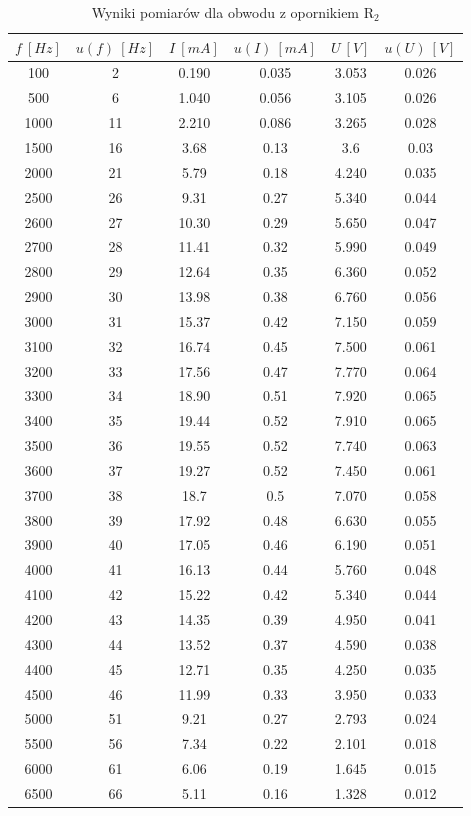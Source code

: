 \documentclass[12pt, a4paper, oneside]{article}
\begin{document}
\clearpage
\begin{table}[h]
  \centering
  \caption{Wyniki pomiarów dla obwodu z opornikiem R$_2$}
    \begin{tabular}{|c|c|c|c|c|c|}\hline
    $f~[Hz]$ & $u(f)~[Hz]$ & $I~[mA]$ & $u(I)~[mA]$ & $U~[V]$ & $u(U)~[V]$ \\\hline
    100 & 2 & 0.190 & 0.035 & 3.053 & 0.026 \\\hline
    500 & 6 & 1.040 & 0.056 & 3.105 & 0.026 \\\hline
    1000 & 11 & 2.210 & 0.086 & 3.265 & 0.028 \\\hline
    1500 & 16 & 3.68 & 0.13 & 3.6 & 0.03 \\\hline
    2000 & 21 & 5.79 & 0.18 & 4.240 & 0.035 \\\hline
    2500 & 26 & 9.31 & 0.27 & 5.340 & 0.044 \\\hline
    2600 & 27 & 10.30 & 0.29 & 5.650 & 0.047 \\\hline
    2700 & 28 & 11.41 & 0.32 & 5.990 & 0.049 \\\hline
    2800 & 29 & 12.64 & 0.35 & 6.360 & 0.052 \\\hline
    2900 & 30 & 13.98 & 0.38 & 6.760 & 0.056 \\\hline
    3000 & 31 & 15.37 & 0.42 & 7.150 & 0.059 \\\hline
    3100 & 32 & 16.74 & 0.45 & 7.500 & 0.061 \\\hline
    3200 & 33 & 17.56 & 0.47 & 7.770 & 0.064 \\\hline
    3300 & 34 & 18.90 & 0.51 & 7.920 & 0.065 \\\hline
    3400 & 35 & 19.44 & 0.52 & 7.910 & 0.065 \\\hline
    3500 & 36 & 19.55 & 0.52 & 7.740 & 0.063 \\\hline
    3600 & 37 & 19.27 & 0.52 & 7.450 & 0.061 \\\hline
    3700 & 38 & 18.7 & 0.5 & 7.070 & 0.058 \\\hline
    3800 & 39 & 17.92 & 0.48 & 6.630 & 0.055 \\\hline
    3900 & 40 & 17.05 & 0.46 & 6.190 & 0.051 \\\hline
    4000 & 41 & 16.13 & 0.44 & 5.760 & 0.048 \\\hline
    4100 & 42 & 15.22 & 0.42 & 5.340 & 0.044 \\\hline
    4200 & 43 & 14.35 & 0.39 & 4.950 & 0.041 \\\hline
    4300 & 44 & 13.52 & 0.37 & 4.590 & 0.038 \\\hline
    4400 & 45 & 12.71 & 0.35 & 4.250 & 0.035 \\\hline
    4500 & 46 & 11.99 & 0.33 & 3.950 & 0.033 \\\hline
    5000 & 51 & 9.21 & 0.27 & 2.793 & 0.024 \\\hline
    5500 & 56 & 7.34 & 0.22 & 2.101 & 0.018 \\\hline
    6000 & 61 & 6.06 & 0.19 & 1.645 & 0.015 \\\hline
    6500 & 66 & 5.11 & 0.16 & 1.328 & 0.012 \\\hline
    \end{tabular}%
  \label{tab:addlabel}%
\end{table}%
\end{document}
